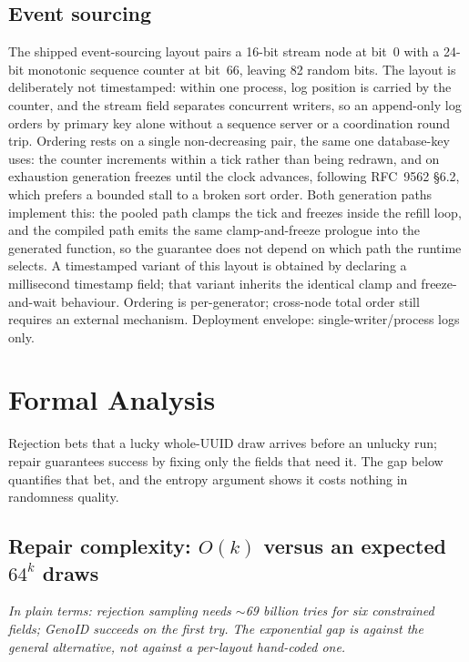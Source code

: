 \documentclass{svproc}
\begin{document}
\subsection{Event sourcing}
The shipped event-sourcing layout pairs a 16-bit stream node at bit~0 with a 24-bit monotonic sequence counter at bit~66, leaving 82 random bits. The layout is deliberately not timestamped: within one process, log position is carried by the counter, and the stream field separates concurrent writers, so an append-only log orders by primary key alone without a sequence server or a coordination round trip. Ordering rests on a single non-decreasing pair, the same one database-key uses: the counter increments within a tick rather than being redrawn, and on exhaustion generation freezes until the clock advances, following RFC~9562 \S6.2, which prefers a bounded stall to a broken sort order. Both generation paths implement this: the pooled path clamps the tick and freezes inside the refill loop, and the compiled path emits the same clamp-and-freeze prologue into the generated function, so the guarantee does not depend on which path the runtime selects. A timestamped variant of this layout is obtained by declaring a millisecond timestamp field; that variant inherits the identical clamp and freeze-and-wait behaviour. Ordering is per-generator; cross-node total order still requires an external mechanism. Deployment envelope: single-writer/process logs only.

\section{Formal Analysis}
\label{sec:formal}
Rejection bets that a lucky whole-UUID draw arrives before an unlucky run; repair guarantees success by fixing only the fields that need it. The gap below quantifies that bet, and the entropy argument shows it costs nothing in randomness quality.

\subsection{Repair complexity: $O(k)$ versus an expected $64^k$ draws}
\label{sec:repair-complexity}

\noindent\emph{In plain terms: rejection sampling needs $\sim$69 billion tries for six constrained fields; GenoID succeeds on the first try. The exponential gap is against the general alternative, not against a per-layout hand-coded one.}
\end{document}
